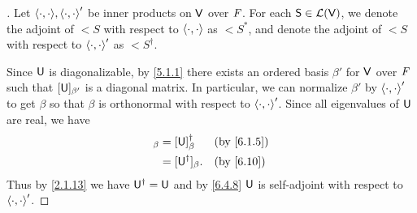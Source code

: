 \begin{proof}[]
  Let \(\inn{\cdot, \cdot}, \inn{\cdot, \cdot}'\) be inner products on \(\mathsf{V}\) over \(\mathit{F}\).
  For each \(\mathsf{S} \in \mathcal{L}(\mathsf{V})\), we denote the adjoint of \(\lt{S}\) with respect to \(\left\langle\cdot, \cdot\right\rangle\) as \(\lt{S}^*\), and denote the adjoint of \(\lt{S}\) with respect to \(\left\langle\cdot, \cdot\right\rangle'\) as \(\lt{S}^{\dag}\).

  Since \(\mathsf{U}\) is diagonalizable, by \cref{5.1.1} there exists an ordered basis \(\beta'\) for \(\mathsf{V}\) over \(\mathit{F}\) such that \([\mathsf{U}]_{\beta'}\) is a diagonal matrix.
  In particular, we can normalize \(\beta'\) by \(\left\langle\cdot, \cdot\right\rangle'\) to get \(\beta\) so that \(\beta\) is orthonormal with respect to \(\left\langle\cdot, \cdot\right\rangle'\).
  Since all eigenvalues of \(\mathsf{U}\) are real, we have
  \begin{align*}
    [\U]_{\beta} & = [\U]_{\beta}^{\dag}  &  & \text{(by \cref{6.1.5})} \\
                 & = [\U^{\dag}]_{\beta}. &  & \text{(by \cref{6.10})}
  \end{align*}
  Thus by \cref{2.1.13} we have \(\mathsf{U}^{\dag} = \mathsf{U}\) and by \cref{6.4.8} \(\mathsf{U}\) is self-adjoint with respect to \(\left\langle\cdot, \cdot\right\rangle'\).


\end{proof}
